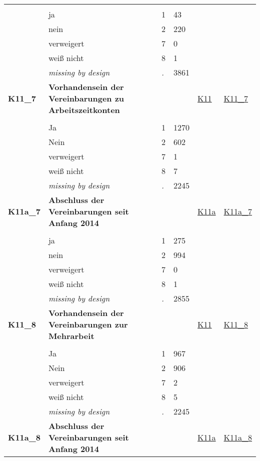\begin{longtable}{| L{2.45cm} | L{6cm} | C{1.5cm} | R{1cm} | C{2.25cm} | C{2.25cm} |}
   &  &  &  &  &  \\ 
   & ja & 1 & 43 &  &  \\ 
   & nein & 2 & 220 &  &  \\ 
   & verweigert & 7 & 0 &  &  \\ 
   & weiß nicht & 8 & 1 &  &  \\ 
   & \textit{missing by design} & \textit{.} & 3861 &  &  \\ 
   \midrule
\textbf{K11\_7}\label{var:K11:7} & \textbf{Vorhandensein der Vereinbarungen zu Arbeitszeitkonten} &  &  & \hyperref[K11]{K11} & \hyperref[var:suf:K11:7]{K11\_7} \\ 
   &  &  &  &  &  \\ 
   & Ja & 1 & 1270 &  &  \\ 
   & Nein & 2 & 602 &  &  \\ 
   & verweigert & 7 & 1 &  &  \\ 
   & weiß nicht & 8 & 7 &  &  \\ 
   & \textit{missing by design} & \textit{.} & 2245 &  &  \\ 
   \midrule
\textbf{K11a\_7}\label{var:K11a:7} & \textbf{Abschluss der Vereinbarungen seit Anfang 2014} &  &  & \hyperref[K11a]{K11a} & \hyperref[var:suf:K11a:7]{K11a\_7} \\ 
   &  &  &  &  &  \\ 
   & ja & 1 & 275 &  &  \\ 
   & nein & 2 & 994 &  &  \\ 
   & verweigert & 7 & 0 &  &  \\ 
   & weiß nicht & 8 & 1 &  &  \\ 
   & \textit{missing by design} & \textit{.} & 2855 &  &  \\ 
   \midrule
\textbf{K11\_8}\label{var:K11:8} & \textbf{Vorhandensein der Vereinbarungen zur Mehrarbeit} &  &  & \hyperref[K11]{K11} & \hyperref[var:suf:K11:8]{K11\_8} \\ 
   &  &  &  &  &  \\ 
   & Ja & 1 & 967 &  &  \\ 
   & Nein & 2 & 906 &  &  \\ 
   & verweigert & 7 & 2 &  &  \\ 
   & weiß nicht & 8 & 5 &  &  \\ 
   & \textit{missing by design} & \textit{.} & 2245 &  &  \\ 
   \midrule
\textbf{K11a\_8}\label{var:K11a:8} & \textbf{Abschluss der Vereinbarungen seit Anfang 2014} &  &  & \hyperref[K11a]{K11a} & \hyperref[var:suf:K11a:8]{K11a\_8} \\ 

\end{longtable}
